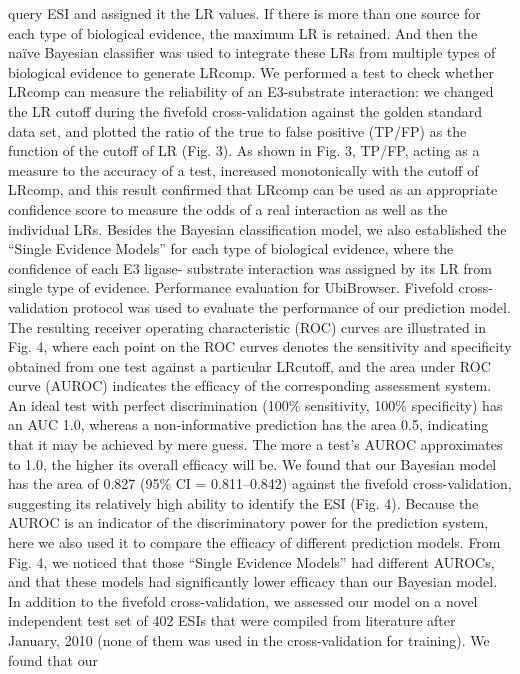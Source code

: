 query ESI and assigned it the LR values. If there is more than one
source for each type of biological evidence, the maximum LR is
retained. And then the naïve Bayesian classiﬁer was used to
integrate these LRs from multiple types of biological evidence to
generate LRcomp.
We performed a test to check whether LRcomp can measure the
reliability of an E3-substrate interaction: we changed the LR
cutoff during the ﬁvefold cross-validation against the golden
standard data set, and plotted the ratio of the true to false positive
(TP/FP) as the function of the cutoff of LR (Fig. 3). As shown in
Fig. 3, TP/FP, acting as a measure to the accuracy of a test,
increased monotonically with the cutoff of LRcomp, and this result
conﬁrmed that LRcomp can be used as an appropriate conﬁdence
score to measure the odds of a real interaction as well as the
individual LRs. Besides the Bayesian classiﬁcation model, we also
established the “Single Evidence Models” for each type of
biological evidence, where the conﬁdence of each E3 ligase-
substrate interaction was assigned by its LR from single type of
evidence.
Performance
evaluation
for
UbiBrowser.
Fivefold
cross-
validation protocol was used to evaluate the performance of our
prediction model. The resulting receiver operating characteristic
(ROC) curves are illustrated in Fig. 4, where each point on the
ROC curves denotes the sensitivity and speciﬁcity obtained from
one test against a particular LRcutoff, and the area under ROC
curve (AUROC) indicates the efﬁcacy of the corresponding
assessment system. An ideal test with perfect discrimination
(100\% sensitivity, 100\% speciﬁcity) has an AUC 1.0, whereas a
non-informative prediction has the area 0.5, indicating that it
may be achieved by mere guess. The more a test’s AUROC
approximates to 1.0, the higher its overall efﬁcacy will be. We
found that our Bayesian model has the area of 0.827 (95\% CI =
0.811–0.842) against the ﬁvefold cross-validation, suggesting its
relatively high ability to identify the ESI (Fig. 4).
Because the AUROC is an indicator of the discriminatory
power for the prediction system, here we also used it to compare
the efﬁcacy of different prediction models. From Fig. 4, we
noticed that those “Single Evidence Models” had different
AUROCs, and that these models had signiﬁcantly lower efﬁcacy
than our Bayesian model.
In addition to the ﬁvefold cross-validation, we assessed our
model on a novel independent test set of 402 ESIs that were
compiled from literature after January, 2010 (none of them was
used in the cross-validation for training). We found that our

